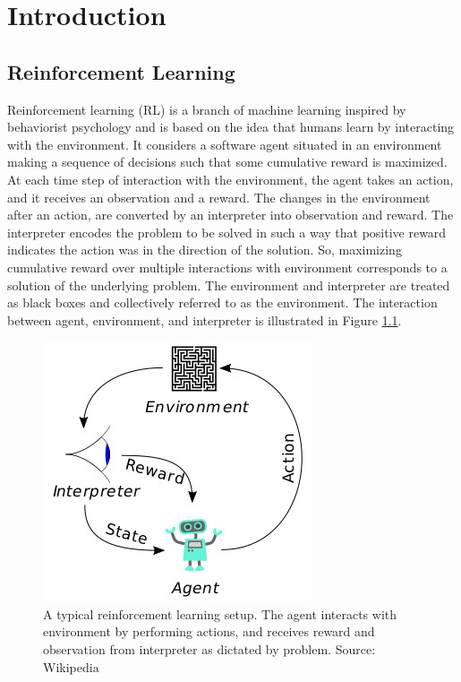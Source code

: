 
\chapter{Introduction}\label{chapter:introduction}

\section{Reinforcement Learning}
Reinforcement learning (RL) is a branch of machine learning inspired by behaviorist psychology and is based on the idea that humans learn by interacting with the environment. It considers a software agent situated in an environment making a sequence of decisions such that some cumulative reward is maximized. At each time step of interaction with the environment, the agent takes an action, and it receives an observation and a reward. The changes in the environment after an action, are converted by an interpreter into observation and reward. The interpreter encodes the problem to be solved in such a way that positive reward indicates the action was in the direction of the solution. So, maximizing cumulative reward over multiple interactions with environment corresponds to a solution of the underlying problem. The environment and interpreter are treated as black boxes and collectively referred to as the environment. The interaction between agent, environment, and interpreter is illustrated in Figure \ref{fig:01_rl}.

\begin{figure}[h]
    \centering
    \includegraphics[width=.45\linewidth]{figures/01/rl.jpg}
    \caption{A typical reinforcement learning setup. The agent interacts with environment by performing actions, and receives reward and observation from interpreter as dictated by problem. Source: Wikipedia}
    \label{fig:01_rl}
\end{figure}

